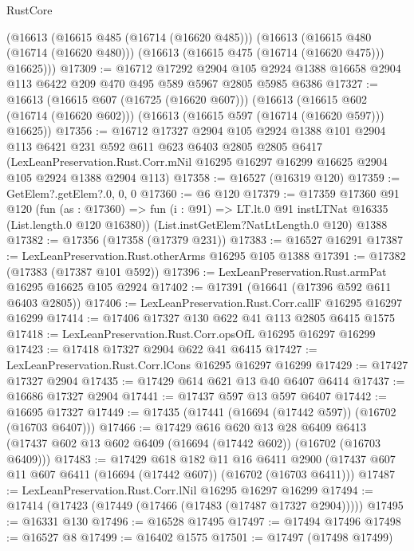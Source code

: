 \begin{lexlean}{RustCore}
\begin{coremodule}
    (@16613
      (@16615 @485 (@16714 (@16620 @485)))
      (@16613
        (@16615 @480 (@16714 (@16620 @480)))
        (@16613 (@16615 @475 (@16714 (@16620 @475))) @16625)))
@17309 := @16712
    @17292
    @2904
    @105
    @2924
    @1388
    @16658
    @2904
    @113
    @6422
    @209
    @470
    @495
    @589
    @5967
    @2805
    @5985
    @6386
@17327 := @16613
    (@16615 @607 (@16725 (@16620 @607)))
    (@16613
      (@16615 @602 (@16714 (@16620 @602)))
      (@16613 (@16615 @597 (@16714 (@16620 @597))) @16625))
@17356 := @16712
    @17327
    @2904
    @105
    @2924
    @1388
    @101
    @2904
    @113
    @6421
    @231
    @592
    @611
    @623
    @6403
    @2805
    @2805
    @6417
    (LexLeanPreservation.Rust.Corr.mNil
      @16295
      @16297
      @16299
      @16625
      @2904
      @105
      @2924
      @1388
      @2904
      @113)
@17358 := @16527 (@16319 @120)
@17359 := GetElem?.getElem?.{0, 0, 0}
@17360 := @6 @120
@17379 := @17359
    @17360
    @91
    @120
    (fun (as : @17360) =>
    fun (i : @91) => LT.lt.{0} @91 instLTNat @16335 (List.length.{0} @120 @16380))
    (List.instGetElem?NatLtLength.{0} @120)
    @1388
@17382 := @17356 (@17358 (@17379 @231))
@17383 := @16527 @16291
@17387 := LexLeanPreservation.Rust.otherArms @16295 @105 @1388
@17391 := @17382 (@17383 (@17387 @101 @592))
@17396 := LexLeanPreservation.Rust.armPat @16295 @16625 @105 @2924
@17402 := @17391 (@16641 (@17396 @592 @611 @6403 @2805))
@17406 := LexLeanPreservation.Rust.Corr.callF @16295 @16297 @16299
@17414 := @17406 @17327 @130 @622 @41 @113 @2805 @6415 @1575
@17418 := LexLeanPreservation.Rust.Corr.opsOfL @16295 @16297 @16299
@17423 := @17418 @17327 @2904 @622 @41 @6415
@17427 := LexLeanPreservation.Rust.Corr.lCons @16295 @16297 @16299
@17429 := @17427 @17327 @2904
@17435 := @17429 @614 @621 @13 @40 @6407 @6414
@17437 := @16686 @17327 @2904
@17441 := @17437 @597 @13 @597 @6407
@17442 := @16695 @17327
@17449 := @17435 (@17441 (@16694 (@17442 @597)) (@16702 (@16703 @6407)))
@17466 := @17429
    @616
    @620
    @13
    @28
    @6409
    @6413
    (@17437 @602 @13 @602 @6409 (@16694 (@17442 @602)) (@16702 (@16703 @6409)))
@17483 := @17429
    @618
    @182
    @11
    @16
    @6411
    @2900
    (@17437 @607 @11 @607 @6411 (@16694 (@17442 @607)) (@16702 (@16703 @6411)))
@17487 := LexLeanPreservation.Rust.Corr.lNil @16295 @16297 @16299
@17494 := @17414 (@17423 (@17449 (@17466 (@17483 (@17487 @17327 @2904)))))
@17495 := @16331 @130
@17496 := @16528 @17495
@17497 := @17494 @17496
@17498 := @16527 @8
@17499 := @16402 @1575
@17501 := @17497 (@17498 @17499)

\end{coremodule}
\end{lexlean}
